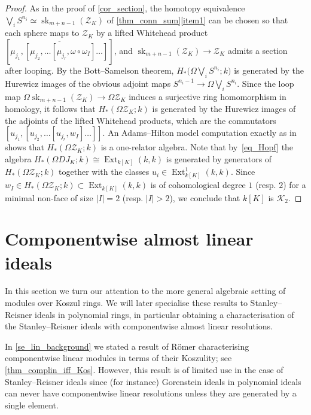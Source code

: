 \documentclass[a4paper,10pt]{amsart}
\theoremstyle{definition}
\theoremstyle{remark}
\DeclareMathOperator{\Ext}{Ext}
\begin{document}
\begin{proof}
As in the proof of \cref{cor_section}, the homotopy equivalence $\bigvee_iS^{n_i} \simeq \operatorname{sk}_{m+n-1}(\mathcal{Z}_K)$ of \cref{thm_conn_sum}\ref{item1} can be chosen so that each sphere maps to $\mathcal{Z}_K$ by a lifted Whitehead product $[\overline{\mu_{j_1},[\mu_{j_2},\ldots[\mu_{j_r},\omega\circ\omega_I]\ldots]}]$, and $\operatorname{sk}_{m+n-1}(\mathcal{Z}_K) \to \mathcal{Z}_K$ admits a section after looping. By the Bott--Samelson theorem, $H_*\bigl(\Omega\bigvee_iS^{n_i};k\bigr)$ is generated by the Hurewicz images of the obvious adjoint maps $S^{n_i-1} \to \Omega\bigvee_iS^{n_i}$. Since the loop map $\Omega\operatorname{sk}_{m+n-1}(\mathcal{Z}_K) \to \Omega\mathcal{Z}_K$ induces a surjective ring homomorphism in homology, it follows that $H_*(\Omega\mathcal{Z}_K;k)$ is generated by the Hurewicz images of the adjoints of the lifted Whitehead products, which are the commutators $[u_{j_1},[u_{j_2},\ldots[u_{j_r},w_I]\ldots]]$. An Adams--Hilton model computation exactly as in~\cite[Proposition~4.1]{GISP} shows that $H_*(\Omega\mathcal{Z}_K;k)$ is a one-relator algebra. Note that by~\eqref{eq_Hopf} the algebra $H_*(\Omega DJ_K;k) \cong \Ext_{k[K]}(k,k)$ is generated by generators of $H_*(\Omega\mathcal{Z}_K;k)$ together with the classes $u_i\in \Ext^1_{k[K]}(k,k)$. Since $w_I\in H_*(\Omega\mathcal{Z}_K;k) \subset \Ext_{k[K]}(k,k)$ is of cohomological degree $1$ (resp. $2$) for a minimal non-face of size $|I|=2$ (resp. $|I|>2$), we conclude that $k[K]$ is $\mathcal{K}_2$.
\end{proof}



\section{Componentwise almost linear ideals}
\label{se_CAL_algebra}

In this section we turn our attention to the more general algebraic setting of modules over Koszul rings. We will later specialise these results to Stanley--Reisner ideals in polynomial rings, in particular obtaining a characterisation of the Stanley--Reisner ideals with componentwise almost linear resolutions.

In \cref{se_lin_background} we stated a result of R\"omer characterising componentwise linear modules in terms of their Koszulity; see \cref{thm_complin_iff_Kos}. However, this result is of limited use in the case of Stanley--Reisner ideals since (for instance) Gorenstein ideals in polynomial ideals can never have componentwise linear resolutions unless they are generated by a single element.
\end{document}
